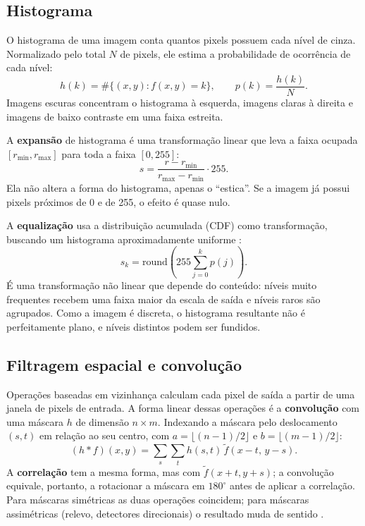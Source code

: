\documentclass[11pt,a4paper]{article}
\begin{document}
\subsection{Histograma}

O histograma de uma imagem conta quantos pixels possuem cada nível de cinza. Normalizado
pelo total $N$ de pixels, ele estima a probabilidade de ocorrência de cada nível:
\begin{equation}
  h(k) = \#\{(x, y) : f(x, y) = k\}, \qquad p(k) = \frac{h(k)}{N}.
\end{equation}
Imagens escuras concentram o histograma à esquerda, imagens claras à direita e imagens de
baixo contraste em uma faixa estreita.

A \textbf{expansão} de histograma é uma transformação linear que leva a faixa ocupada
$[r_{\min}, r_{\max}]$ para toda a faixa $[0, 255]$:
\begin{equation}
  s = \frac{r - r_{\min}}{r_{\max} - r_{\min}} \cdot 255.
\end{equation}
Ela não altera a forma do histograma, apenas o ``estica''. Se a imagem já possui pixels
próximos de 0 e de 255, o efeito é quase nulo.

A \textbf{equalização} usa a distribuição acumulada (CDF) como transformação, buscando um
histograma aproximadamente uniforme \cite{gonzalez}:
\begin{equation}
  s_k = \mathrm{round}\!\left(255 \sum_{j=0}^{k} p(j)\right).
\end{equation}
É uma transformação não linear que depende do conteúdo: níveis muito frequentes recebem
uma faixa maior da escala de saída e níveis raros são agrupados. Como a imagem é discreta,
o histograma resultante não é perfeitamente plano, e níveis distintos podem ser fundidos.

\subsection{Filtragem espacial e convolução}

Operações baseadas em vizinhança calculam cada pixel de saída a partir de uma janela de
pixels de entrada. A forma linear dessas operações é a \textbf{convolução} com uma máscara
$h$ de dimensão $n \times m$. Indexando a máscara pelo deslocamento $(s, t)$ em relação ao
seu centro, com $a = \lfloor (n-1)/2 \rfloor$ e $b = \lfloor (m-1)/2 \rfloor$:
\begin{equation}
  (h * f)(x, y) = \sum_{s} \sum_{t} h(s, t)\, \tilde f(x - t,\, y - s).
\end{equation}
A \textbf{correlação} tem a mesma forma, mas com $\tilde f(x + t, y + s)$; a convolução
equivale, portanto, a rotacionar a máscara em $180^\circ$ antes de aplicar a correlação.
Para máscaras simétricas as duas operações coincidem; para máscaras assimétricas (relevo,
detectores direcionais) o resultado muda de sentido \cite{gonzalez}.
\end{document}

